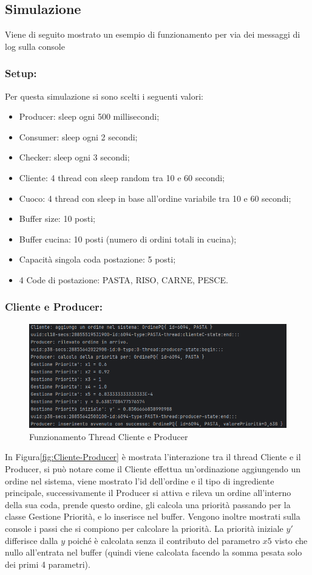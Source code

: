 \subsection{Simulazione}
Viene di seguito mostrato un esempio di funzionamento per via dei messaggi di log sulla console
\subsubsection{Setup:}
Per questa simulazione si sono scelti i seguenti valori:
\begin{itemize}
	\item Producer: sleep ogni 500 millisecondi;
	\item Consumer: sleep ogni 2 secondi;
	\item Checker: sleep ogni 3 secondi;
	\item Cliente: 4 thread con sleep random tra 10 e 60 secondi;
	\item Cuoco: 4 thread con sleep in base all'ordine variabile tra 10 e 60 secondi;
	\item Buffer size: 10 posti;
	\item Buffer cucina: 10 posti (numero di ordini totali in cucina);
	\item Capacità singola coda postazione: 5 posti;
	\item 4 Code di postazione: PASTA, RISO, CARNE, PESCE.
\end{itemize}
\subsubsection{Cliente e Producer:}
\begin{figure}[H]
	\centering
	\includegraphics[scale=0.75]{iterazione3/images/Cliente-Producer.png}
	\caption{Funzionamento Thread Cliente e Producer \label{fig:Cliente-Producer}}
\end{figure}
In Figura\vref{fig:Cliente-Producer} è mostrata l'interazione tra il thread Cliente e il Producer, si può notare come il Cliente effettua un'ordinazione aggiungendo un ordine nel sistema, viene mostrato l'id dell'ordine e il tipo di ingrediente principale, successivamente il Producer si attiva e rileva un ordine all'interno della sua coda, prende questo ordine, gli calcola una priorità passando per la classe Gestione Priorità, e lo inserisce nel buffer. Vengono inoltre mostrati sulla console i passi che si compiono per calcolare la priorità. La priorità iniziale $y'$ differisce dalla $y$ poiché è calcolata senza il contributo del parametro $x5$ visto che nullo all'entrata nel buffer (quindi viene calcolata facendo la somma pesata solo dei primi 4 parametri).
